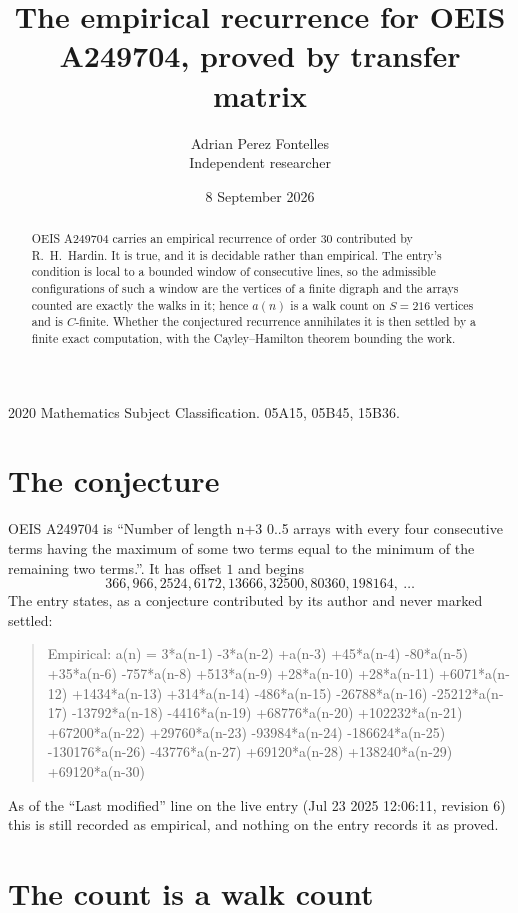 \documentclass[11pt,a4paper]{article}
\title{The empirical recurrence for OEIS A249704, proved by transfer matrix}
\author{Adrian Perez Fontelles\\ \small Independent researcher}
\date{8 September 2026}
\theoremstyle{plain}
\theoremstyle{definition}
\begin{document}
\maketitle

\begin{abstract}
OEIS A249704 carries an empirical recurrence of order $30$ contributed by R.~H.~Hardin. It is
true, and it is decidable rather than empirical. The entry's condition is local to a bounded window of consecutive lines, so
the admissible configurations of such a window are the vertices of a finite digraph and the
arrays counted are exactly the walks in it; hence $a(n)$ is a walk count on $S=216$ vertices
and is $C$-finite. Whether the conjectured recurrence annihilates it is then settled by a
finite exact computation, with the Cayley--Hamilton theorem bounding the work.
\end{abstract}

\noindent\small 2020 Mathematics Subject Classification. 05A15, 05B45, 15B36.\normalsize

\section{The conjecture}

OEIS A249704 is ``Number of length n+3 0..5 arrays with every four consecutive terms having the maximum of some two terms equal to the minimum of the remaining two terms.''. It has offset $1$ and begins
\[
366, 966, 2524, 6172, 13666, 32500, 80360, 198164,\ \dots
\]
The entry states, as a conjecture contributed by its author and never marked settled:
\begin{quote}
Empirical: a(n) = 3*a(n-1) -3*a(n-2) +a(n-3) +45*a(n-4) -80*a(n-5) +35*a(n-6) -757*a(n-8) +513*a(n-9) +28*a(n-10) +28*a(n-11) +6071*a(n-12) +1434*a(n-13) +314*a(n-14) -486*a(n-15) -26788*a(n-16) -25212*a(n-17) -13792*a(n-18) -4416*a(n-19) +68776*a(n-20) +102232*a(n-21) +67200*a(n-22) +29760*a(n-23) -93984*a(n-24) -186624*a(n-25) -130176*a(n-26) -43776*a(n-27) +69120*a(n-28) +138240*a(n-29) +69120*a(n-30)
\end{quote}
As of the ``Last modified'' line on the live entry (Jul 23 2025 12:06:11, revision 6) this is still
recorded as empirical, and nothing on the entry records it as proved.

\section{The count is a walk count}
\end{document}
